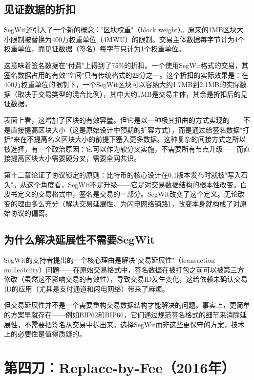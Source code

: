 \documentclass[a4paper,12pt,openany]{ctexbook}
\begin{document}
\subsection*{见证数据的折扣}


SegWit还引入了一个新的概念："区块权重"（block weight）。原来的1MB区块大小限制被替换为400万权重单位（4MWU）的限制。交易主体数据每字节计为4个权重单位，而见证数据（签名）每字节只计为1个权重单位。

这意味着签名数据在"付费"上得到了75\%的折扣。一个使用SegWit格式的交易，其签名数据占用的有效"空间"只有传统格式的四分之一。这个折扣的实际效果是：在400万权重单位的限制下，一个SegWit区块可以容纳大约1.7MB到2.1MB的实际数据（取决于交易类型的混合比例），其中大约1MB是交易主体，其余是折扣后的见证数据。

表面上看，这增加了区块的有效容量。但它是以一种极其扭曲的方式实现的——不是直接提高区块大小（这是原始设计中预期的扩容方式），而是通过给签名数据"打折"来在不提高名义区块大小的前提下塞入更多数据。这种复杂的间接方式之所以被选择，有一个政治原因：它可以作为软分叉实施，不需要所有节点升级——而直接提高区块大小需要硬分叉，需要全网共识。

第十二章论证了协议锁定的原则：比特币的核心设计在0.1版本发布时就被"写入石头"。从这个角度看，SegWit不是升级——它是对交易数据结构的根本性改变。白皮书定义的交易格式中，签名是交易的一部分。SegWit改变了这个定义。无论改变的理由多么充分（解决交易延展性、为闪电网络铺路），改变本身就构成了对原始协议的偏离。


\subsection*{为什么解决延展性不需要SegWit}


SegWit的支持者提出的一个核心理由是解决"交易延展性"（transaction malleability）问题——在原始交易格式中，签名数据在被打包之前可以被第三方修改（虽然这不影响交易的有效性），导致交易ID发生变化，这给依赖未确认交易ID的应用（尤其是支付通道和闪电网络）带来了麻烦。

但交易延展性并不是一个需要重构交易数据结构才能解决的问题。事实上，更简单的方案早就存在——例如BIP62和BIP66，它们通过规范签名格式的细节来消除延展性，不需要把签名从交易中拆出来。选择SegWit而非这些更保守的方案，技术上的必要性是值得质疑的。


\section*{第四刀：Replace-by-Fee（2016年）}
\end{document}
